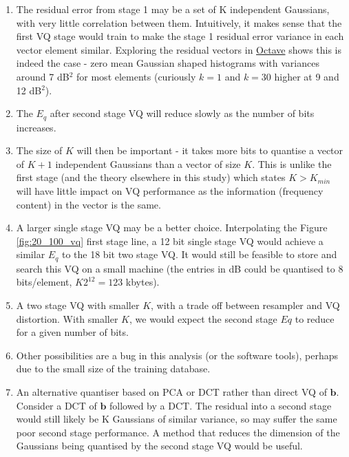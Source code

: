 \documentclass{article}
\begin{document}
\begin{enumerate}

\item The residual error from stage 1 may be a set of K independent Gaussians, with very little correlation between them.  Intuitively, it makes sense that the first VQ stage would train to make the stage 1 residual error variance in each vector element similar.  Exploring the residual vectors in \url{Octave} shows this is indeed the case - zero mean Gaussian shaped histograms with variances around 7 dB$^2$ for most elements (curiously $k=1$ and $k=30$ higher at 9 and 12 dB$^2$).

\item The $E_q$ after second stage VQ will reduce slowly as the number of bits increases.  

\item The size of $K$ will then be important - it takes more bits to quantise a vector of $K+1$ independent Gaussians than a vector of size $K$.  This is unlike the first stage (and the theory elsewhere in this study) which states $K>K_{min}$ will have little impact on VQ performance as the information (frequency content) in the vector is the same.
 
\item A larger single stage VQ may be a better choice.  Interpolating the Figure \ref{fig:20_100_vq} first stage line, a 12 bit single stage VQ would achieve a similar $E_q$ to the 18 bit two stage VQ.  It would still be feasible to store and search this VQ on a small machine (the entries in dB could be quantised to 8 bits/element, $K2^{12}=123$ kbytes).

\item A two stage VQ with smaller $K$, with a trade off between resampler and VQ distortion.  With smaller $K$, we would expect the second stage $Eq$ to reduce for a given number of bits.

\item Other possibilities are a bug in this analysis (or the software tools), perhaps due to the small size of the training database. 

\item An alternative quantiser based on PCA or DCT rather than direct VQ of $\mathbf{b}$.  Consider a DCT of $\mathbf{b}$ followed by a DCT. The residual into a second stage would still likely be K Gaussians of similar variance, so may suffer the same poor second stage performance.  A method that reduces the dimension of the Gaussians being quantised by the second stage VQ would be useful.

\end{enumerate}
\end{document}
